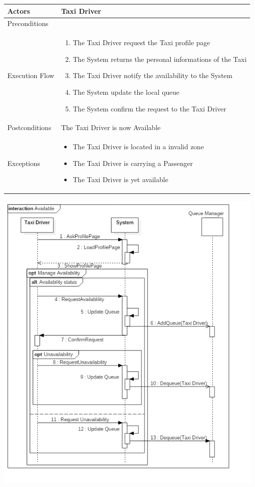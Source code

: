 \documentclass[english]{article}
\begin{document}
\begin{tabular}{lp{8cm}}
\hline
Actors & Taxi Driver \\
\hline
Preconditions & \\
\hline
Execution Flow &  
		\begin{enumerate}
			\item The Taxi Driver request the Taxi profile page
			\item The System returns the personal informations of the Taxi
			\item The Taxi Driver notify the availability to the System
			\item The System update the local queue
			\item The System confirm the request to the Taxi Driver
		\end{enumerate} 
	\\ 
\hline
Postconditions & The Taxi Driver is now Available \\
\hline
Exceptions & 
	\begin{itemize} 
		\item The Taxi Driver is located in a invalid zone
		\item The Taxi Driver is carrying a Passenger
		\item The Taxi Driver is yet available
	\end{itemize}
\end{tabular}

\includegraphics[width=\textwidth]{Available}
\end{document}
